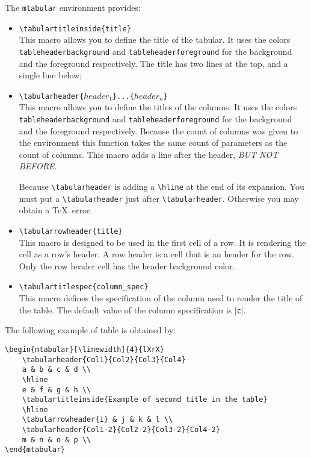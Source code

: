 \documentclass[book,taskpackage,specpackage,codepackage]{upmethodology-document}
\begin{document}
The \texttt{mtabular} environment provides:
\begin{itemize}
\item \texttt{{\textbackslash}tabulartitleinside\{title\}} \\
	This macro allows you to define the title of the tabular. It uses the colors \texttt{tableheaderbackground} and \texttt{tableheaderforeground} for the background and the foreground respectively. The title has two lines at the top, and a single line below;

\item \texttt{{\textbackslash}tabularheader\{$header_1$\}...\{$header_n$\}} \\
	This macro allows you to define the titles of the columns. It uses the colors \texttt{tableheaderbackground} and \texttt{tableheaderforeground} for the background and the foreground respectively. Because the count of columns was given to the environment this function takes the same count of parameters as the count of columns. This macro adds a line after the header, \emph{BUT NOT BEFORE}.
\begin{upmcaution}
	Because \texttt{{\textbackslash}tabularheader} is adding a \texttt{{\textbackslash}hline} at the end of its expansion. You must put a \texttt{{\textbackslash}tabularheader} just after \texttt{{\textbackslash}tabularheader}. Otherwise you may obtain a \TeX\ error.
\end{upmcaution}

\item \texttt{{\textbackslash}tabularrowheader\{title\}} \\
	This macro is designed to be used in the first cell of a row. It is rendering the cell as a row's header. A row header is a cell that is an header for the row. Only the row header cell has the header background color.

\item \texttt{{\textbackslash}tabulartitlespec\{column\_spec\}} \\
	This macro defines the specification of the column used to render the title of the table.
	The default value of the column specification is $|$\texttt{c}$|$.

\end{itemize}

The following example of table is obtained by: \\
\begin{verbatim}
\begin{mtabular}[\linewidth]{4}{lXrX}
	\tabularheader{Col1}{Col2}{Col3}{Col4}
	a & b & c & d \\
	\hline
	e & f & g & h \\
	\tabulartitleinside{Example of second title in the table}
	\hline
	\tabularrowheader{i} & j & k & l \\
	\tabularheader{Col1-2}{Col2-2}{Col3-2}{Col4-2}
	m & n & o & p \\
\end{mtabular}
\end{verbatim}
\end{document}
